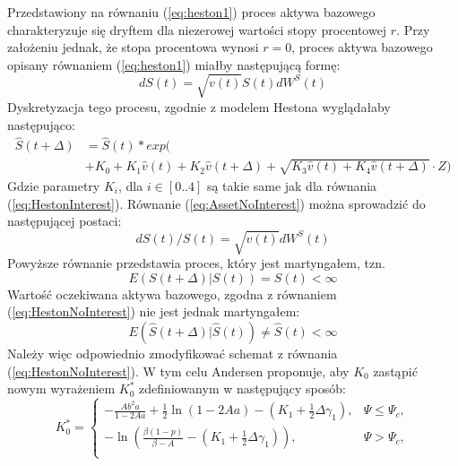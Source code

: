 \documentclass{pracamgr}
\begin{document}
Przedstawiony na równaniu (\ref{eq:heston1}) proces aktywa bazowego charakteryzuje się dryftem dla
niezerowej wartości stopy procentowej $r$.
Przy założeniu jednak, że stopa procentowa wynosi $r = 0$, proces aktywa 
bazowego opisany równaniem (\ref{eq:heston1}) miałby
następującą formę:
\begin{equation}
\label{eq:AssetNoInterest}
dS(t)  = \sqrt{v(t)} S(t) dW^S(t)
\end{equation}
Dyskretyzacja tego procesu, zgodnie z modelem Hestona wyglądałaby następująco:
\begin{equation}
\begin{aligned}
\label{eq:HestonNoInterest} 
\hat{S}(t + \Delta) &= \hat{S}(t) * exp(\\ 
                    &+ K_0 + K_1 \hat{v}(t) 
                    + K_2 \hat{v}(t+\Delta)
                    + \sqrt{K_3 \hat{v}(t) +  K_4 \hat{v}(t+\Delta)} \cdot Z)

\end{aligned}
\end{equation}
Gdzie parametry $K_i$, dla $i \in [0..4]$ są takie same jak dla równania (\ref{eq:HestonInterest}).
Równanie (\ref{eq:AssetNoInterest}) można sprowadzić do następującej postaci:
\begin{equation}
dS(t)/S(t) = \sqrt{v(t)}  dW^S(t)
\end{equation}
Powyższe równanie przedstawia proces, który jest martyngałem, tzn. 
\begin{equation}
E(S(t + \Delta)| S(t)) = S(t) < \infty
\end{equation}
Wartość oczekiwana aktywa bazowego, zgodna z równaniem (\ref{eq:HestonNoInterest})
nie jest jednak martyngałem:
\begin{equation}
  E(\hat{S}(t + \Delta)| \hat{S}(t)) \neq \hat{S}(t) < \infty
\end{equation}
Należy więc odpowiednio zmodyfikować schemat z równania (\ref{eq:HestonNoInterest}). W tym celu
Andersen proponuje, aby $K_0$ zastąpić nowym wyrażeniem $K_0^*$ zdefiniowanym w następujący 
sposób:
\begin{equation}
\label{eq:psi}
K_0^* =
            \begin{cases}
               - \frac{Ab^2a}{1-2Aa} + \frac{1}{2} \ln (1 - 2Aa) - (K_1 + \frac{1}{2} \Delta \gamma_1), &  \Psi \leq \Psi_c,\\
               - \ln (\frac{\beta (1-p)}{\beta - A} - (K_1 + \frac{1}{2} \Delta \gamma_1)), & \Psi > \Psi_c,\\
            \end{cases} 
\end{equation} 
\end{document}
